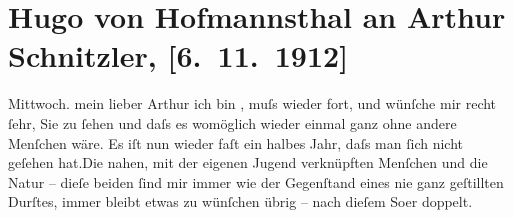 

         
         \renewcommand{\erwaehntePersonen}{Personen: Hugo von Hofmannsthal, Olga Schnitzler}
         \renewcommand{\erwaehnteOrte}{Orte: Berlin, Dresden, Neubeuern, Wien}
         \renewcommand{\erwaehnteWerke}{}
               \section[Hugo von Hofmannsthal an Arthur Schnitzler, {[}6. 11. 1912{]}]{ Hugo von Hofmannsthal an Arthur Schnitzler, {[}6. 11. 1912{]}}\nopagebreak{}\rehead{ }\begin{ledgroupsized}[t]{13cm}\normalsize\beginnumbering{} \toendnotes[C]{\smallbreak\pagebreak[2]} 
\toendnotes[C]{\smallbreak}\pstart
           \raggedleft{}{\pb}Mittwoch.\pend
           \pstart{}mein lieber Arthur\pend\pstart
           ich bin \label{K_L02093-1v}\label{K_L02093-1h}, muſs \label{K_L02093-2v}\label{K_L02093-2h} wieder fort, und wünſche mir recht ſehr,
               Sie zu ſehen und daſs es womöglich wieder einmal ganz ohne andere Menſchen wäre.\pend
           \pstart
           Es iſt nun wieder faſt ein halbes Jahr, daſs man ſich nicht geſehen hat.\hspace*{1.5em}Die nahen, mit der eigenen Jugend verknüpften Menſchen
               und die Natur – dieſe beiden ſind mir immer wie der Gegenſtand eines nie ganz
               geſtillten Durſtes, immer bleibt etwas zu wünſchen übrig – nach dieſem So{\geminationm}er doppelt.\pend

\end{ledgroupsized}
